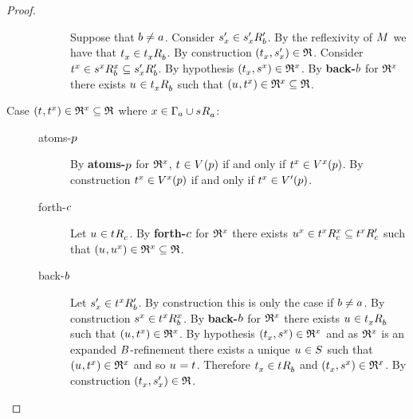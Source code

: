 \begin{proof}
\begin{description}
\begin{description}
                Suppose that $\agentB \neq \agentA$.
                Consider $\kStateSP_x \in \kSuccessorsPB{\kStateSP_x}$.
                By the reflexivity of $\kModel$ we have that $\kStateT_x \in \kSuccessorsB{\kStateT_x}$.
                By construction $(\kStateT_x, \kStateSP_x) \in \refinement$.
                Consider $\kStateT[x] \in \kSuccessorsB[x]{\kStateS[x]} \subseteq \kSuccessorsPB{\kStateSP_x}$.
                By hypothesis $(\kStateT_x, \kStateS[x]) \in \refinement^x$.
                By {\bf back-$\agentB$} for $\refinement^x$ there exists $\kStateU \in \kSuccessorsB{\kStateT_x}$ such that $(\kStateU, \kStateT[x]) \in \refinement^x \subseteq \refinement$.
        \end{description}
    \item[{Case $(\kStateT, \kStateT[x]) \in \refinement^x \subseteq \refinement$ where $x \in \Gamma_\agentA \cup \kSuccessorsA{\kStateS}$:}]
        \hfill
        \begin{description}
            \item[atoms-$\atomP$] 
                By {\bf atoms-$\atomP$} for $\refinement^x$, $\kStateT \in \kValuation(\atomP)$ if and only if $\kStateT[x] \in \kValuation[x](\atomP)$.
                By construction $\kStateT[x] \in \kValuation[x](\atomP)$ if and only if $\kStateT[x] \in \kValuationP(\atomP)$.
            \item[forth-$\agentC$]
                Let $\kStateU \in \kSuccessorsC{\kStateT}$.
                By {\bf forth-$\agentC$} for $\refinement^x$ there exists $\kStateU[x] \in \kSuccessorsC[x]{\kStateT[x]} \subseteq \kSuccessorsPC{\kStateT[x]}$ such that $(\kStateU, \kStateU[x]) \in \refinement^x \subseteq \refinement$.
            \item[back-$\agentB$]
                Let $\kStateSP_x \in \kSuccessorsPB{\kStateT[x]}$.
                By construction this is only the case if $\agentB \neq \agentA$.
                By construction $\kStateS[x] \in \kSuccessorsB[x]{\kStateT[x]}$.
                By {\bf back-$\agentB$} for $\refinement^x$ there exists $\kStateU \in \kSuccessorsB{\kStateT_x}$ such that $(\kStateU, \kStateT[x]) \in \refinement^x$.
                By hypothesis $(\kStateT_x, \kStateS[x]) \in \refinement^x$ and as $\refinement^x$ is an expanded $\agentsB$-refinement there exists a unique $\kStateU \in \kStates$ such that $(\kStateU, \kStateT[x]) \in \refinement^x$ and so $\kStateU = \kStateT$.
                Therefore $\kStateT_x \in \kSuccessorsB{\kStateT}$ and $(\kStateT_x, \kStateS[x]) \in \refinement^x$.
                By construction $(\kStateT_x, \kStateSP_x) \in \refinement$.


\end{description}
\end{description}
\end{proof}
